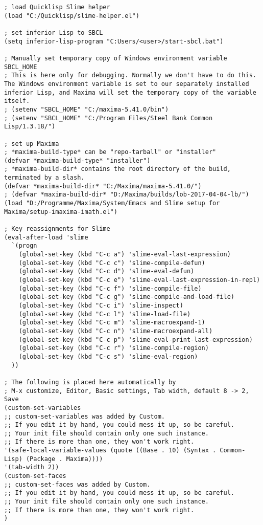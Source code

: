 \documentclass[../Maxima_Workbook.tex]{subfiles}
\begin{document}
\lzz \begin{lstlisting}[style=lisp]
; load Quicklisp Slime helper
(load "C:/Quicklisp/slime-helper.el")

; set inferior Lisp to SBCL
(setq inferior-lisp-program "C:Users/<user>/start-sbcl.bat")

; Manually set temporary copy of Windows environment variable SBCL_HOME
; This is here only for debugging. Normally we don't have to do this. The Windows environment variable is set to our separately installed inferior Lisp, and Maxima will set the temporary copy of the variable itself.
; (setenv "SBCL_HOME" "C:/maxima-5.41.0/bin")
; (setenv "SBCL_HOME" "C:/Program Files/Steel Bank Common Lisp/1.3.18/")

; set up Maxima
; *maxima-build-type* can be "repo-tarball" or "installer"
(defvar *maxima-build-type* "installer")
; *maxima-build-dir* contains the root directory of the build, terminated by a slash.
(defvar *maxima-build-dir* "C:/Maxima/maxima-5.41.0/")
; (defvar *maxima-build-dir* "D:/Maxima/builds/lob-2017-04-04-lb/")
(load "D:/Programme/Maxima/System/Emacs and Slime setup for Maxima/setup-imaxima-imath.el")

; Key reassignments for Slime
(eval-after-load 'slime
  `(progn
    (global-set-key (kbd "C-c a") 'slime-eval-last-expression)
    (global-set-key (kbd "C-c c") 'slime-compile-defun)
    (global-set-key (kbd "C-c d") 'slime-eval-defun)
    (global-set-key (kbd "C-c e") 'slime-eval-last-expression-in-repl)
    (global-set-key (kbd "C-c f") 'slime-compile-file)
    (global-set-key (kbd "C-c g") 'slime-compile-and-load-file)
    (global-set-key (kbd "C-c i") 'slime-inspect)
    (global-set-key (kbd "C-c l") 'slime-load-file)
    (global-set-key (kbd "C-c m") 'slime-macroexpand-1)
    (global-set-key (kbd "C-c n") 'slime-macroexpand-all)
    (global-set-key (kbd "C-c p") 'slime-eval-print-last-expression)
    (global-set-key (kbd "C-c r") 'slime-compile-region)
    (global-set-key (kbd "C-c s") 'slime-eval-region)
  ))

; The following is placed here automatically by
; M-x customize, Editor, Basic settings, Tab width, default 8 -> 2, Save
(custom-set-variables
;; custom-set-variables was added by Custom.
;; If you edit it by hand, you could mess it up, so be careful.
;; Your init file should contain only one such instance.
;; If there is more than one, they won't work right.
'(safe-local-variable-values (quote ((Base . 10) (Syntax . Common-Lisp) (Package . Maxima))))
'(tab-width 2))
(custom-set-faces
;; custom-set-faces was added by Custom.
;; If you edit it by hand, you could mess it up, so be careful.
;; Your init file should contain only one such instance.
;; If there is more than one, they won't work right.
)
\end{lstlisting}
\end{document}
